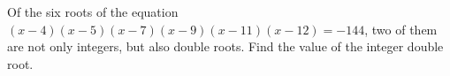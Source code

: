 Of the six roots of the equation $(x - 4) (x - 5) (x- 7) (x - 9) (x- 11) (x- 12) = -144$, two of them are not only integers, but also double roots. Find the value of the integer double root.
